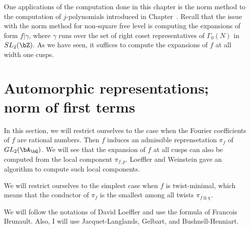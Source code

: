\documentclass [11pt, proquest] {uwthesis}[2015/03/03]
\begin{document}
One applications of the computation done in this chapter is the norm method to the computation of $j$-polynomials 
introduced in Chapter~. Recall that the issue with the norm method for non-square free level is computing the 
expansions of form $f | \gamma$, where $\gamma$ runs over the set of right coset representatives of $\Gamma_0(N)$ 
in $SL_2(\bZ)$. As we have seen, it suffices to compute the expansions of 
$f$ at all width one cusps.
\iffalse
\begin{Lemma}
For any cusp $z$ of $X_0(N)$, there exists an Atkin-Lehner involution $w \in W(N)$ such that $z_1 = w(z)$ has 
width one.
\end{Lemma}

\begin{proof}
Let $z \neq [\infty]$ be a cusp. Recall that $z$ has width one if and only if its denominator $d(z)$ satisfies
$d(z)^2 \equiv 0 \pmod{N}$. Let $p$ be a prime divisor of $N$. Then it is easy to see that 
$v_p(d(w_p(z))) = v_p(N) -  v_p(d(z))$ and $v_l(d(w_p(z))) = v_l(d(z))$ for primes $l \neq p$. The lemma now follows by taking $w = \prod_{p \mid N: v_p(d(z)) \leq v_p(N)/2} w_p$. 
\end{proof}
\fi

\section{Automorphic representations; norm of first terms}

In this section, we will restrict ourselves to the case when the Fourier coefficients of $f$ are rational numbers. Then 
$f$ induces an admissible reprensetation $\pi_f$ of $GL_2(\bA_\bQ)$. We will see that the expansion of $f$ at all cusps can also be computed from the local component $\pi_{f,p}$. Loeffler and Weinstein gave an algorithm to compute such 
local components. 

We will restrict ourselves to the simplest case when $f$ is twist-minimal, which means that the conductor of $\pi_f$ is the smallest among all  twists $\pi_{f \otimes \chi}$. 

We will follow the notations of David Loeffler and use the formula of Francois Brunault. Also, I will use Jacquet-Langlands, 
Gelbart, and Bushnell-Henniart. 


\end{document}
